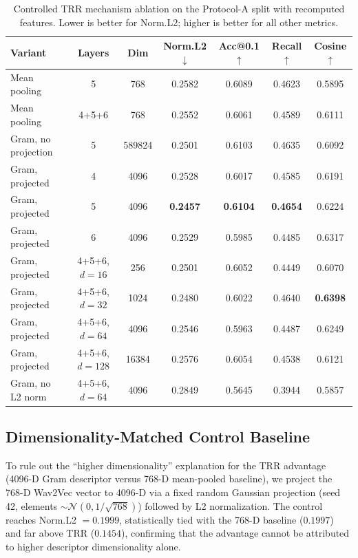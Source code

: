\documentclass[journal,10pt]{IEEEtran}
\begin{document}
\begin{table}[t]
\centering
\caption{Controlled TRR mechanism ablation on the Protocol-A split with recomputed features. Lower is better for Norm.L2; higher is better for all other metrics.}
\label{tab:trr_mechanism_ablation}
\footnotesize
\setlength{\tabcolsep}{4pt}
\begin{tabular*}{\textwidth}{@{\extracolsep{\fill}}lcccccc}
\toprule
\textbf{Variant} & \textbf{Layers} & \textbf{Dim} & \textbf{Norm.L2}$\downarrow$ & \textbf{Acc@0.1}$\uparrow$ & \textbf{Recall}$\uparrow$ & \textbf{Cosine}$\uparrow$ \\
\midrule
Mean pooling & 5 & 768 & 0.2582 & 0.6089 & 0.4623 & 0.5895 \\
Mean pooling & 4+5+6 & 768 & 0.2552 & 0.6061 & 0.4589 & 0.6111 \\
Gram, no projection & 5 & 589824 & 0.2501 & 0.6103 & 0.4635 & 0.6092 \\
Gram, projected & 4 & 4096 & 0.2528 & 0.6017 & 0.4585 & 0.6191 \\
Gram, projected & 5 & 4096 & \textbf{0.2457} & \textbf{0.6104} & \textbf{0.4654} & 0.6224 \\
Gram, projected & 6 & 4096 & 0.2529 & 0.5985 & 0.4485 & 0.6317 \\
Gram, projected & 4+5+6, $d=16$ & 256 & 0.2501 & 0.6052 & 0.4449 & 0.6070 \\
Gram, projected & 4+5+6, $d=32$ & 1024 & 0.2480 & 0.6022 & 0.4640 & \textbf{0.6398} \\
Gram, projected & 4+5+6, $d=64$ & 4096 & 0.2546 & 0.5963 & 0.4487 & 0.6249 \\
Gram, projected & 4+5+6, $d=128$ & 16384 & 0.2576 & 0.6054 & 0.4538 & 0.6121 \\
Gram, no L2 norm & 4+5+6, $d=64$ & 4096 & 0.2849 & 0.5645 & 0.3944 & 0.5857 \\
\bottomrule
\end{tabular*}
\end{table}

\subsection{Dimensionality-Matched Control Baseline}

To rule out the ``higher dimensionality'' explanation for the TRR advantage (4096-D Gram descriptor versus 768-D mean-pooled baseline), we project the 768-D Wav2Vec vector to 4096-D via a fixed random Gaussian projection (seed 42, elements $\sim \mathcal{N}(0, 1/\sqrt{768})$) followed by L2 normalization. The control reaches Norm.L2 $=0.1999$, statistically tied with the 768-D baseline ($0.1997$) and far above TRR ($0.1454$), confirming that the advantage cannot be attributed to higher descriptor dimensionality alone.
\end{document}
